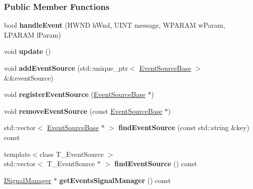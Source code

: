 \subsubsection*{Public Member Functions}
\begin{DoxyCompactItemize}
\item 
bool {\bfseries handle\+Event} (H\+W\+ND h\+Wnd, U\+I\+NT message, W\+P\+A\+R\+AM w\+Param, L\+P\+A\+R\+AM l\+Param)\hypertarget{a00035_ab3fc7d9983060d9f5cb078f650b00944}{}\label{a00035_ab3fc7d9983060d9f5cb078f650b00944}

\item 
void {\bfseries update} ()\hypertarget{a00034_a5e321019b94d4be4e294951dc15d9bc8}{}\label{a00034_a5e321019b94d4be4e294951dc15d9bc8}

\item 
void {\bfseries add\+Event\+Source} (std\+::unique\+\_\+ptr$<$ \hyperlink{a00036}{Event\+Source\+Base} $>$ \&\&event\+Source)\hypertarget{a00034_ad8ae4d432415974ed273712d621b4b80}{}\label{a00034_ad8ae4d432415974ed273712d621b4b80}

\item 
void {\bfseries register\+Event\+Source} (\hyperlink{a00036}{Event\+Source\+Base} $\ast$)\hypertarget{a00034_a256dc81b8f38d55108fd146075975e76}{}\label{a00034_a256dc81b8f38d55108fd146075975e76}

\item 
void {\bfseries remove\+Event\+Source} (const \hyperlink{a00036}{Event\+Source\+Base} $\ast$)\hypertarget{a00034_ada92665ef93dca332fb60aad4397e741}{}\label{a00034_ada92665ef93dca332fb60aad4397e741}

\item 
std\+::vector$<$ \hyperlink{a00036}{Event\+Source\+Base} $\ast$ $>$ {\bfseries find\+Event\+Source} (const std\+::string \&key) const \hypertarget{a00034_a1973627817da759061278d41dfdf3596}{}\label{a00034_a1973627817da759061278d41dfdf3596}

\item 
{\footnotesize template$<$class T\+\_\+\+Event\+Source $>$ }\\std\+::vector$<$ T\+\_\+\+Event\+Source $\ast$ $>$ {\bfseries find\+Event\+Source} () const \hypertarget{a00034_a8a6707354f1d2dcce3c3c3e0d901c29e}{}\label{a00034_a8a6707354f1d2dcce3c3c3e0d901c29e}

\item 
\hyperlink{a00051}{I\+Signal\+Manager} $\ast$ {\bfseries get\+Events\+Signal\+Manager} () const \hypertarget{a00034_ada7ff964f3ee3c20a34324adc606872b}{}\label{a00034_ada7ff964f3ee3c20a34324adc606872b}

\end{DoxyCompactItemize}

